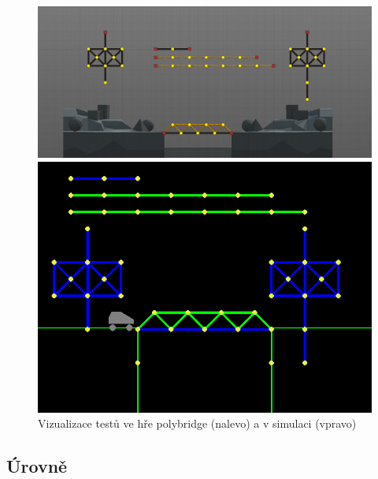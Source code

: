 \begin{figure}[ht]
    \centering
    \begin{minipage}{0.49\textwidth}
        \centering
        \includegraphics[width=\linewidth]{img/poly_tests.png}
    \end{minipage}\hfill
    \begin{minipage}{0.49\textwidth}
        \centering
        \includegraphics[width=\linewidth]{img/sim_tests.png}
    \end{minipage}
    \caption{Vizualizace testů ve hře polybridge (nalevo) a v simulaci (vpravo)}
    \label{fig:1}
\end{figure}



\subsection{Úrovně}

